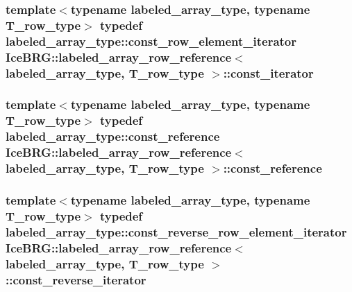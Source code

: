 \subsubsection[{const\+\_\+iterator}]{\setlength{\rightskip}{0pt plus 5cm}template$<$typename labeled\+\_\+array\+\_\+type, typename T\+\_\+row\+\_\+type$>$ typedef labeled\+\_\+array\+\_\+type\+::const\+\_\+row\+\_\+element\+\_\+iterator {\bf Ice\+B\+R\+G\+::labeled\+\_\+array\+\_\+row\+\_\+reference}$<$ labeled\+\_\+array\+\_\+type, T\+\_\+row\+\_\+type $>$\+::{\bf const\+\_\+iterator}}\label{classIceBRG_1_1labeled__array__row__reference_a32426fe25a4b7f8659eb5fe2b58ecba2}
\hypertarget{classIceBRG_1_1labeled__array__row__reference_a7343692e3cbf28a9edfff61f6812f355}{}
\subsubsection[{const\+\_\+reference}]{\setlength{\rightskip}{0pt plus 5cm}template$<$typename labeled\+\_\+array\+\_\+type, typename T\+\_\+row\+\_\+type$>$ typedef labeled\+\_\+array\+\_\+type\+::const\+\_\+reference {\bf Ice\+B\+R\+G\+::labeled\+\_\+array\+\_\+row\+\_\+reference}$<$ labeled\+\_\+array\+\_\+type, T\+\_\+row\+\_\+type $>$\+::{\bf const\+\_\+reference}}\label{classIceBRG_1_1labeled__array__row__reference_a7343692e3cbf28a9edfff61f6812f355}
\hypertarget{classIceBRG_1_1labeled__array__row__reference_a4bb091c3a6d8be3b433acbc02745fa0a}{}
\subsubsection[{const\+\_\+reverse\+\_\+iterator}]{\setlength{\rightskip}{0pt plus 5cm}template$<$typename labeled\+\_\+array\+\_\+type, typename T\+\_\+row\+\_\+type$>$ typedef labeled\+\_\+array\+\_\+type\+::const\+\_\+reverse\+\_\+row\+\_\+element\+\_\+iterator {\bf Ice\+B\+R\+G\+::labeled\+\_\+array\+\_\+row\+\_\+reference}$<$ labeled\+\_\+array\+\_\+type, T\+\_\+row\+\_\+type $>$\+::{\bf const\+\_\+reverse\+\_\+iterator}}\label{classIceBRG_1_1labeled__array__row__reference_a4bb091c3a6d8be3b433acbc02745fa0a}
\hypertarget{classIceBRG_1_1labeled__array__row__reference_a80b2a3ea3231a22bf8c493841ad8cf3a}{}
